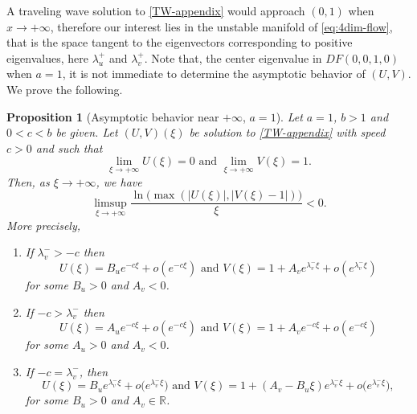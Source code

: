 \documentclass[11pt,a4paper]{article}
\newtheorem{proposition}[theorem]{\textbf{Proposition}}
\numberwithin{equation}{section}
\numberwithin{figure}{section}
\begin{document}
A traveling wave solution to \eqref{TW-appendix} would approach $(0,1)$ when $x\to +\infty$, therefore our interest lies in the unstable manifold of \eqref{eq:4dim-flow}, that is the space tangent to the eigenvectors corresponding to positive eigenvalues, here $\lambda_{u}^{+} $ and $\lambda_{v}^{+}$. 
Note that, the center eigenvalue in $DF(0, 0, 1, 0)$ when $a=1$, it is not immediate to determine the asymptotic behavior of $(U, V)$. We prove the following. 
\begin{proposition}[Asymptotic behavior near $+\infty$, $a=1$]\label{prop:asym-invaded} 
Let $a=1$,  $b>1$ and $0<c<b$ be given. Let $(U,V)(\xi)$ be  solution to \eqref{TW-appendix} with speed $c>0$ and such that 
    \begin{equation*}
        \lim_{\xi\to+\infty} U(\xi) = 0 \text{ and } \lim_{\xi\to+\infty} V(\xi)=1.
    \end{equation*}
    Then, as $\xi\to +\infty$, we have
    \begin{equation*}%
        \limsup_{\xi\to +\infty} \dfrac{\ln\big(\max(|U(\xi)|, |V(\xi)-1|)\big)}{\xi}<0.
    \end{equation*}
    More precisely, 
    \begin{enumerate}
        \item[(1)] If $\lambda_{v}^{-} > -c$ then
            \begin{equation*}
                U(\xi) = B_u e^{-c \xi}+o\left(e^{-c\xi}\right) \text{ and } V(\xi) = 1+A_ve^{\lambda_{v}^{-}\xi} + o\left(e^{\lambda_{v}^{-}\xi}\right)
            \end{equation*}
            for some $B_u>0$ and $A_v<0$. 
        \item[(2)] If $-c>\lambda_{v}^{-}$ then 
            \begin{equation*}
                 U(\xi) = A_u e^{-c\xi}+o\left(e^{-c\xi}\right) \text{ and } V(\xi) = 1+A_ve^{-c\xi} + o\left(e^{-c\xi}\right)
            \end{equation*}
            for some $A_u>0$ and $A_v<0$. 
        \item[(3)] If $-c=\lambda_{v}^{-}$, then 
            \begin{equation*}
                U(\xi) = B_ue^{\lambda_{v}^{-}\xi}+ o\big(e^{\lambda_{v}^{-}\xi}\big) \text{ and } V(\xi) = 1+(A_v-B_u \xi)e^{\lambda_{v}^{-}\xi}+ o\big(e^{\lambda_{v}^{-}\xi}\big), 
            \end{equation*}
            for some $B_u>0$ and $A_v\in\mathbb R$.
    \end{enumerate}
\end{proposition}
\end{document}
